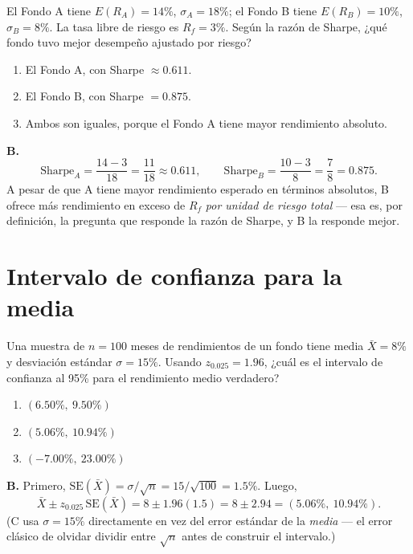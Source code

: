 \documentclass[11pt,a4paper,oneside]{article}
\theoremstyle{definition}
\begin{document}
\begin{cfaBox}
El Fondo A tiene $E(R_A)=14\%$, $\sigma_A=18\%$; el Fondo B tiene
$E(R_B)=10\%$, $\sigma_B=8\%$. La tasa libre de riesgo es
$R_f=3\%$. Según la razón de Sharpe, ¿qué fondo tuvo mejor desempeño
ajustado por riesgo?
\begin{enumerate}[label=\Alph*.]
\item El Fondo A, con Sharpe $\approx0.611$.
\item El Fondo B, con Sharpe $=0.875$.
\item Ambos son iguales, porque el Fondo A tiene mayor rendimiento absoluto.
\end{enumerate}
\end{cfaBox}
\begin{solBox}
\textbf{B.}
\[
\mathrm{Sharpe}_A=\frac{14-3}{18}=\frac{11}{18}\approx0.611, \qquad
\mathrm{Sharpe}_B=\frac{10-3}{8}=\frac{7}{8}=0.875.
\]
A pesar de que A tiene mayor rendimiento esperado en términos absolutos, B
ofrece más rendimiento en exceso de $R_f$ \emph{por unidad de riesgo total}
--- esa es, por definición, la pregunta que responde la razón de Sharpe, y
B la responde mejor.
\end{solBox}

\section{Intervalo de confianza para la media}

\begin{cfaBox}
Una muestra de $n=100$ meses de rendimientos de un fondo tiene media
$\bar X=8\%$ y desviación estándar $\sigma=15\%$. Usando
$z_{0.025}=1.96$, ¿cuál es el intervalo de confianza al 95\% para el
rendimiento medio verdadero?
\begin{enumerate}[label=\Alph*.]
\item $(6.50\%,\ 9.50\%)$
\item $(5.06\%,\ 10.94\%)$
\item $(-7.00\%,\ 23.00\%)$
\end{enumerate}
\end{cfaBox}
\begin{solBox}
\textbf{B.} Primero, $\mathrm{SE}(\bar X)=\sigma/\sqrt n=15/\sqrt{100}=1.5\%$.
Luego,
\[
\bar X\pm z_{0.025}\,\mathrm{SE}(\bar X)=8\pm1.96(1.5)=8\pm2.94=(5.06\%,\ 10.94\%).
\]
(C usa $\sigma=15\%$ directamente en vez del error estándar de la
\emph{media} --- el error clásico de olvidar dividir entre $\sqrt n$ antes
de construir el intervalo.)
\end{solBox}
\end{document}
